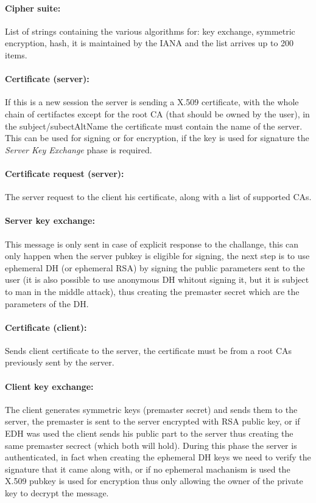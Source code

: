 \documentclass[12pt]{article}
\begin{document}
\paragraph{Cipher suite:}
List of strings containing the various algorithms for: key exchange, symmetric encryption, hash, it is maintained by the IANA and the list arrives up to 200 items.

\paragraph{Certificate (server):}
If this is a new session the server is sending a X.509 certificate, with the whole chain of certifactes except for the root CA (that should be owned by the user), in the subject/subectAltName the certificate must contain the name of the server. This can be used for signing or for encryption, if the key is used for signature the \textit{Server Key Exchange} phase is required.

\paragraph{Certificate request (server): }
The server request to the client his certificate, along with a list of supported CAs.

\paragraph{Server key exchange:}
This message is only sent in case of explicit response to the challange, this can only happen when the server pubkey is eligible for signing, the next step is to use ephemeral DH (or ephemeral RSA) by signing the public parameters sent to the user (it is also possible to use anonymous DH whitout signing it, but it is subject to man in the middle attack), thus creating the premaster secret which are the parameters of the DH.

\paragraph{Certificate (client):}
Sends client certificate to the server, the certificate must be from a root CAs previously sent by the server.

\paragraph{Client key exchange:}
The client generates symmetric keys (premaster secret) and sends them to the server, the premaster is sent to the server encrypted with RSA public key, or if EDH was used the client sends his public part to the server thus creating the same premaster secrect (which both will hold). During this phase the server is authenticated, in fact when creating the ephemeral DH keys we need to verify the signature that it came along with, or if no ephemeral machanism is used the X.509 pubkey is used for encryption thus only allowing the owner of the private key to decrypt the message.
\end{document}
